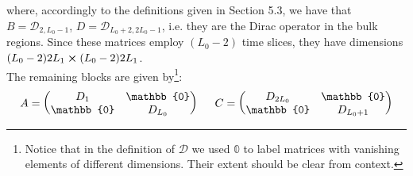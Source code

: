 where, accordingly to the definitions given in Section 5.3, we have that $B = \mathcal{D}_{2, L_0 - 1}$, $D = \mathcal{D}_{L_0 + 2, 2L_0 - 1}$, i.e. they are the Dirac operator in the bulk regions. Since these matrices employ $(L_0 - 2)$ time slices, they have dimensions $(L_0-2)2L_1 \cross (L_0-2)2L_1$.    \\ The remaining blocks are given by\footnote{Notice that in the definition of $\mathcal{D}$ we used $\mathbb{0}$ to label matrices with vanishing elements of different dimensions. Their extent should be clear from context.}:
\begin{equation}
    A = \begin{pmatrix}
        D_1 & \mathbb{0} \\
        \mathbb{0} & D_{L_0} \\
    \end{pmatrix} \hspace{5 mm} C = \begin{pmatrix}
        D_{2L_0} & \mathbb{0} \\
        \mathbb{0} & D_{L_0 + 1} \\
    \end{pmatrix}
\end{equation}
